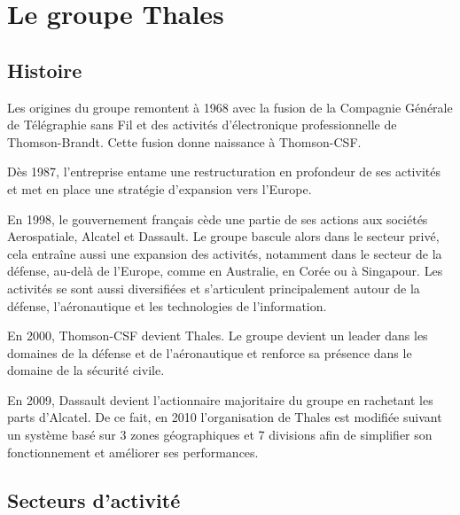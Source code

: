 \chapter{Le groupe Thales}

\section{Histoire}

Les origines du groupe remontent à 1968 avec la fusion de la Compagnie G\'en\'erale de T\'el\'egraphie sans Fil et des activit\'es d’\'electronique professionnelle de Thomson-Brandt. Cette fusion donne naissance à Thomson-CSF.

Dès 1987, l’entreprise entame une restructuration en profondeur de ses activit\'es et met en place une strat\'egie d’expansion vers l’Europe.

En 1998, le gouvernement français cède une partie de ses actions aux soci\'et\'es Aerospatiale, Alcatel et Dassault. Le groupe bascule alors dans le secteur priv\'e, cela entraîne aussi une expansion des activit\'es, notamment dans le secteur de la d\'efense, au-delà de l’Europe, comme en Australie, en Cor\'ee ou à Singapour. Les activit\'es se sont aussi diversifi\'ees et s’articulent principalement autour de la d\'efense, l’a\'eronautique et les technologies de l’information.

En 2000, Thomson-CSF devient Thales. Le groupe devient un leader dans les domaines de la d\'efense et de l’a\'eronautique et renforce sa pr\'esence dans le domaine de la s\'ecurit\'e civile.

En 2009, Dassault devient l’actionnaire majoritaire du groupe en rachetant les parts d’Alcatel. De ce fait, en 2010 l’organisation de Thales est modifi\'ee suivant un système bas\'e sur 3 zones g\'eographiques et 7 divisions afin de simplifier son fonctionnement et am\'eliorer ses performances.

\section{Secteurs d’activit\'e}


